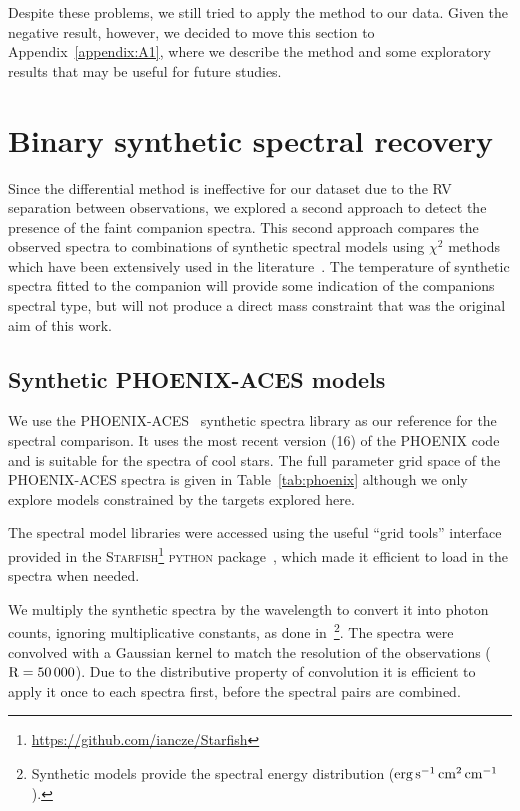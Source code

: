 \documentclass[fleqn,usenatbib]{mnras}
\begin{document}
Despite these problems, we still tried to apply the method to our data. Given the negative result, however, we decided to move this section to Appendix~\ref{appendix:A1}, where we describe the method and some exploratory results that may be useful for future studies.


\section{Binary synthetic spectral recovery}
\label{subsec:companion_recovery}
Since the differential method is ineffective for our dataset due to the RV separation between observations, we explored a second approach to detect the presence of the faint companion spectra. This second approach compares the observed spectra to combinations of synthetic spectral models using \(\chi^{2}\) methods which have been extensively used in the literature~\citep[e.g.][]{astudillo-defru_harps_2015, passegger_fundamental_2016, zechmeister_spectrum_2018,nemravova_xtauri_2016}. {The temperature of synthetic spectra fitted to the companion will provide some indication of the companions spectral type, but will not produce a direct mass constraint that was the original aim of this work.}

\subsection{Synthetic PHOENIX-ACES models}
\label{subsec:spec_models}
We use the PHOENIX-ACES~\citep{husser_new_2013} synthetic spectra library as our reference for the spectral comparison. It uses the most recent version (16) of the PHOENIX code and is suitable for the spectra of cool stars. The full parameter grid space of the PHOENIX-ACES spectra is given in Table~\ref{tab:phoenix} although we only explore models constrained by the targets explored here.



The spectral model libraries were accessed using the useful ``grid tools'' interface provided in the \textsc{Starfish}\footnote{\url{https://github.com/iancze/Starfish}} \textsc{python} package~\citep{czekala_constructing_2015}, which made it efficient to load in the spectra when needed.

We multiply the synthetic spectra by the wavelength to convert it into photon counts, ignoring multiplicative constants, as done in~\citet{figueira_radial_2016}\footnote{Synthetic models provide the spectral energy distribution (\(\rm erg\,s^{-1}\,cm^{2}\,cm^{-1}\)).}. The spectra were convolved with a Gaussian kernel to match the resolution of the observations (\(\rm R=50\,000\)). Due to the distributive property of convolution it is efficient to apply it once to each spectra first, before the spectral pairs are combined.
\end{document}
